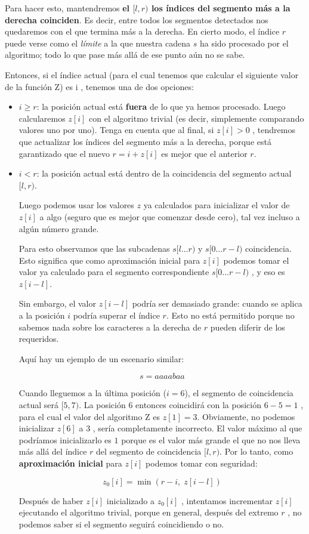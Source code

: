Para hacer esto, mantendremos \textbf{el $[l, r)$ los índices del segmento más a la derecha coinciden}. Es decir, entre todos los segmentos detectados nos
quedaremos con el que termina más a la derecha. En cierto modo, el índice $r$ puede verse como el \emph{límite} a la que nuestra cadena $s$ ha sido
procesado por el algoritmo; todo lo que pase más allá de ese punto aún no se sabe.

Entonces, si el índice actual (para el cual tenemos que calcular el siguiente valor de la función Z) es i , tenemos una de dos opciones:

\begin{itemize}
	\item $i \ge r$: la posición actual está \textbf{fuera} de lo que ya hemos procesado. Luego calcularemos $z[i]$ con el algoritmo trivial (es decir, simplemente comparando valores uno por uno). Tenga en cuenta que al final, si $z[i] > 0$ , tendremos que actualizar los índices del segmento más a la derecha, porque está garantizado que el nuevo $r = i + z[i]$ es mejor que
	el anterior $r$.
	
	\item $i < r$: la posición actual está dentro de la coincidencia del segmento actual $[l, r)$.
	
	Luego podemos usar los valores $z$ ya calculados para inicializar el valor de $z[i]$ a algo (seguro que es mejor que comenzar desde cero), tal vez
	incluso a algún número grande.
	
	Para esto observamos que las subcadenas $s[l \dots r)$ y $s[0 \dots r-l)$ coincidencia. Esto significa que como aproximación inicial para $z[i]$
	podemos tomar el valor ya calculado para el segmento correspondiente $s[0 \dots r-l)$ , y eso es $z[i-l]$.
	
	Sin embargo, el valor $z[i-l]$ podría ser demasiado grande: cuando se aplica a la posición $i$ podría superar el índice $r$. Esto no está permitido porque no sabemos nada sobre los caracteres a la derecha de $r$  pueden diferir de los requeridos.
	
	Aquí hay un ejemplo de un escenario similar:
	
	$$ s = aaaabaa $$
	
	Cuando lleguemos a la última posición ($i=6$), el segmento de coincidencia actual será $[5,7)$. La posición 6 entonces coincidirá con la posición
	$6-5=1$ , para el cual el valor del algoritmo Z es $z[1]=3$. Obviamente, no podemos inicializar $z[6]$ a $3$ , sería completamente incorrecto. El valor máximo al que podríamos inicializarlo es $1$ porque es el valor más grande el que no nos lleva más allá del índice $r$ del segmento de coincidencia $[l, r)$. Por lo tanto, como \textbf{aproximación inicial} para $z[i]$ podemos tomar con seguridad:
	
	$$ z_0[i] = \min(r - i,\; z[i-l]) $$
	
	Después de haber $z[i]$ inicializado a $z_0[i]$ , intentamos incrementar $z[i]$ ejecutando el algoritmo trivial, porque en general, después del extremo $r$ , no podemos saber si el segmento seguirá coincidiendo o no.
	
\end{itemize}

